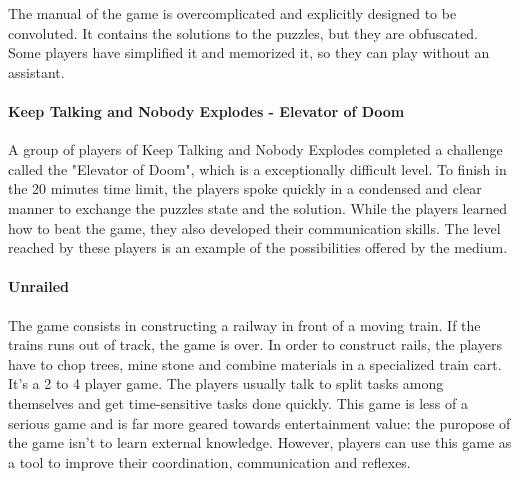 \documentclass[12pt]{article}
\begin{document}
\vspace{0.4cm}
The manual of the game is overcomplicated and explicitly designed to be convoluted. It contains the solutions to the puzzles, but they are obfuscated. Some players have simplified it and memorized it, so they can play without an assistant. 

\paragraph{Keep Talking and Nobody Explodes - Elevator of Doom \cite{ktneelevator}}
A group of players of Keep Talking and Nobody Explodes completed a challenge called the "Elevator of Doom", which is a exceptionally difficult level. To finish in the 20 minutes time limit, the players spoke quickly in a condensed and clear manner to exchange the puzzles state and the solution. While the players learned how to beat the game, they also developed their communication skills. The level reached by these players is an example of the possibilities offered by the medium.

\clearpage

\paragraph{Unrailed} \cite{unrailed}
The game consists in constructing a railway in front of a moving train. If the trains runs out of track, the game is over. In order to construct rails, the players have to chop trees, mine stone and combine materials in a specialized train cart. It's a 2 to 4 player game. The players  usually talk to split tasks among themselves and get time-sensitive tasks done quickly. This game is less of a serious game and is far more geared towards entertainment value: the puropose of the game isn't to learn external knowledge. However, players can use this game as a tool to improve their coordination, communication and reflexes.

\vspace{0.4cm}
\end{document}
